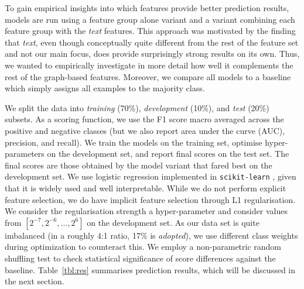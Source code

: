 \documentclass[twocolumn,10pt]{article}
\begin{document}
To gain empirical insights into which features provide better prediction
results, models are run using a feature group alone variant and a variant
combining each feature group with the \emph{text} features. This approach
was motivated by the finding that \emph{text}, even though conceptually
quite different from the rest of the feature set and not our main focus,
does provide surprisingly strong results on its own. Thus, we wanted to
empirically investigate in more detail how well it complements the rest of
the graph-based features. Moreover, we compare all models to a baseline
which simply assigns all examples to the majority class.

We split the data into \emph{training} (70\%), \emph{development} (10\%),
and \emph{test} (20\%) subsets. As a scoring function, we use the F1 score
macro averaged across the positive and negative classes (but we also report
area under the curve (AUC), precision, and recall). We train the models on
the training set, optimise hyper-parameters on the development set, and
report final scores on the test set. The final scores are those obtained by
the model variant that fared best on the development set. We use logistic
regression implemented in \texttt{scikit-learn} \cite{scikit-learn}, given
that it is widely used and well interpretable. While we do not perform
explicit feature selection, we do have implicit feature selection through
L1 regularisation. We consider the regularisation strength a hyper-parameter
and consider values from $[2^{-7}, 2^{-6}, ..., 2^6]$ on the development
set. As our data set is quite imbalanced (in a roughly 4:1 ratio, 17\% is
\emph{adopted}), we use different class weights during optimization to
counteract this. We employ a non-parametric random shuffling test
\cite{yeh-2000-accurate} to check statistical significance of score
differences against the baseline. Table~\ref{tbl:res} summarises prediction
results, which will be discussed in the next section. 
\end{document}
